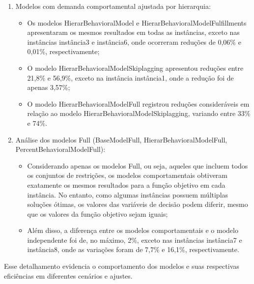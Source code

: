 \begin{enumerate}
    \item Modelos com demanda comportamental ajustada por hierarquia:
    \begin{itemize}
        \item Os modelos HierarBehavioralModel e HierarBehavioralModelFulfillments apresentaram os mesmos resultados em todas as instâncias, exceto nas instâncias instância3 e instância6, onde ocorreram reduções de 0,06\% e 0,01\%, respectivamente;
        \item O modelo HierarBehavioralModelSkiplagging apresentou reduções entre 21,8\% e 56,9\%, exceto na instância instância1, onde a redução foi de apenas 3,57\%;
        \item O modelo HierarBehavioralModelFull registrou reduções consideráveis em relação ao modelo HierarBehavioralModelSkiplagging, variando entre 33\% e 74\%.
    \end{itemize}

    \item Análise dos modelos Full (BaseModelFull, HierarBehavioralModelFull, PercentBehavioralModelFull):
    \begin{itemize}
        \item Considerando apenas os modelos Full, ou seja, aqueles que incluem todos os conjuntos de restrições, os modelos comportamentais obtiveram exatamente os mesmos resultados para a função objetivo em cada instância. No entanto, como algumas instâncias possuem múltiplas soluções ótimas, os valores das variáveis de decisão podem diferir, mesmo que os valores da função objetivo sejam iguais;
        \item Além disso, a diferença entre os modelos comportamentais e o modelo independente foi de, no máximo, 2\%, exceto nas instâncias instância7 e instância8, onde as variações foram de 7,7\% e 16,1\%, respectivamente.
    \end{itemize}

\end{enumerate}


Esse detalhamento evidencia o comportamento dos modelos e suas respectivas eficiências em diferentes cenários e ajustes.